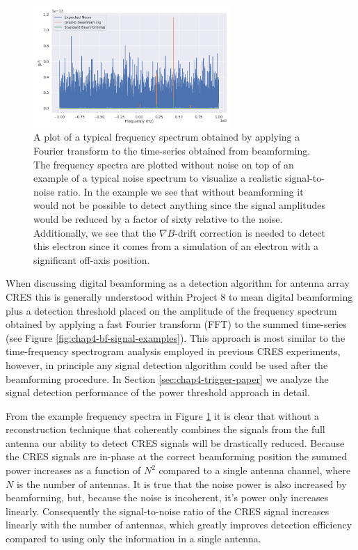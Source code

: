 \begin{figure}[htbp]
    \centering
    \includegraphics[width=0.67\textwidth]{figs/Chapter-4/220304_example_power_spectrum_gradb_vs_noise_vs_standard_bf.png}
    \caption{A plot of a typical frequency spectrum obtained by applying a Fourier transform to the time-series obtained from beamforming. The frequency spectra are plotted without noise on top of an example of a typical noise spectrum to visualize a realistic signal-to-noise ratio. In the example we see that without beamforming it would not be possible to detect anything since the signal amplitudes would be reduced by a factor of sixty relative to the noise. Additionally, we see that the $\nabla B$-drift correction is needed to detect this electron since it comes from a simulation of an electron with a significant off-axis position. }
    \label{fig:chap4-bf-signal-example}
\end{figure}

When discussing digital beamforming as a detection algorithm for antenna array CRES this is generally understood within Project 8 to mean digital beamforming plus a detection threshold placed on the amplitude of the frequency spectrum obtained by applying a fast Fourier transform (FFT) to the summed time-series (see Figure \ref{fig:chap4-bf-signal-examples}). This approach is most similar to the time-frequency spectrogram analysis employed in previous CRES experiments, however, in principle any signal detection algorithm could be used after the beamforming procedure. In Section \ref{sec:chap4-trigger-paper} we analyze the signal detection performance of the power threshold approach in detail.

From the example frequency spectra in Figure \ref{fig:chap4-bf-signal-example} it is clear that without a reconstruction technique that coherently combines the signals from the full antenna our ability to detect CRES signals will be drastically reduced. Because the CRES signals are in-phase at the correct beamforming position the summed power increases as a function of $N^2$ compared to a single antenna channel, where $N$ is the number of antennas. It is true that the noise power is also increased by beamforming, but, because the noise is incoherent, it's power only increases linearly. Consequently the signal-to-noise ratio of the CRES signal increases linearly with the number of antennas, which greatly improves detection efficiency compared to using only the information in a single antenna.


